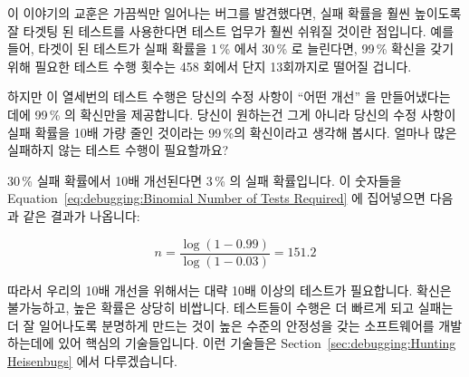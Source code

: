 이 이야기의 교훈은 가끔씩만 일어나는 버그를 발견했다면, 실패 확률을 훨씬
높이도록 잘 타겟팅 된 테스트를 사용한다면 테스트 업무가 훨씬 쉬워질 것이란
점입니다.
예를 들어, 타겟이 된 테스트가 실패 확률을 1\,\% 에서 30\,\% 로 늘린다면, 99\,\%
확신을 갖기 위해 필요한 테스트 수행 횟수는 458 회에서 단지 13회까지로 떨어질
겁니다.

하지만 이 열세번의 테스트 수행은 당신의 수정 사항이 ``어떤 개선'' 을
만들어냈다는 데에 99\,\% 의 확신만을 제공합니다.
당신이 원하는건 그게 아니라 당신의 수정 사항이 실패 확률을 10배 가량 줄인
것이라는 99\,\%의 확신이라고 생각해 봅시다.
얼마나 많은 실패하지 않는 테스트 수행이 필요할까요?

30\,\% 실패 확률에서 10배 개선된다면 3\,\% 의 실패 확률입니다.
이 숫자들을
Equation~\ref{eq:debugging:Binomial Number of Tests Required} 에 집어넣으면
다음과 같은 결과가 나옵니다:

\begin{equation}
	n = \frac{\log\left(1 - 0.99\right)}{\log\left(1 - 0.03\right)} = 151.2
\end{equation}

따라서 우리의 10배 개선을 위해서는 대략 10배 이상의 테스트가 필요합니다.
확신은 불가능하고, 높은 확률은 상당히 비쌉니다.
테스트들이 수행은 더 빠르게 되고 실패는 더 잘 일어나도록 분명하게 만드는 것이
높은 수준의 안정성을 갖는 소프트웨어를 개발하는데에 있어 핵심의 기술들입니다.
이런 기술들은
Section~\ref{sec:debugging:Hunting Heisenbugs} 에서 다루겠습니다.

